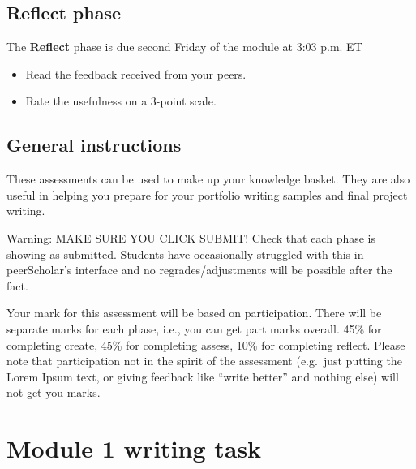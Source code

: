 \documentclass[
  openany]{book}
\begin{document}
\hypertarget{reflect-phase}{%
\subsection{Reflect phase}\label{reflect-phase}}

The \textbf{Reflect} phase is due second Friday of the module at 3:03 p.m. ET

\begin{itemize}
\item
  Read the feedback received from your peers.
\item
  Rate the usefulness on a 3-point scale.
\end{itemize}

\hypertarget{general-instructions-2}{%
\subsection{General instructions}\label{general-instructions-2}}

These assessments can be used to make up your knowledge basket. They are also useful in helping you prepare for your portfolio writing samples and final project writing.

Warning: MAKE SURE YOU CLICK SUBMIT! Check that each phase is showing as submitted. Students have occasionally struggled with this in peerScholar's interface and no regrades/adjustments will be possible after the fact.

Your mark for this assessment will be based on participation. There will be separate marks for each phase, i.e., you can get part marks overall. 45\% for completing create, 45\% for completing assess, 10\% for completing reflect. Please note that participation not in the spirit of the assessment (e.g.~just putting the Lorem Ipsum text, or giving feedback like ``write better'' and nothing else) will not get you marks.

\hypertarget{module-1-writing-task}{%
\section{Module 1 writing task}\label{module-1-writing-task}}
\end{document}
